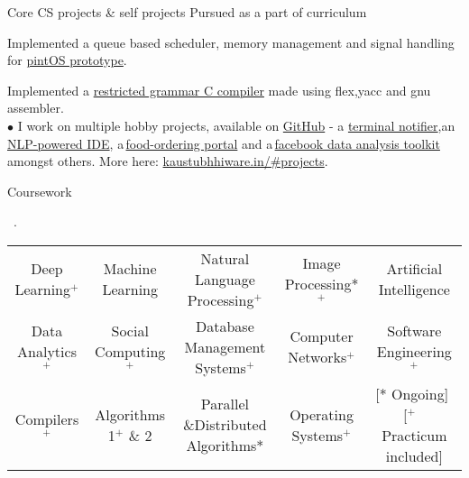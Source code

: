 \documentclass[11pt, a4paper]{resume}
\newcommand{\important}[1]{
  \textcolor{mypurple}{#1}
}
\newcommand{\fillit}[1]{
  \leavevmode\xleaders\hbox{#1}\hfill\kern0pt
}
\newcommand{\sectionSubtitleX}[1]{
  \begin{large}
    \important{#1}
    \end{large}
    \fillit{\important{.}}
}
\begin{document}

\begin{rSubsection}{Core CS projects \& self projects}{\hspace*{\fill} Pursued as a part of curriculum}{}{}
\item Implemented a queue based scheduler, memory management and signal handling for \href{https://github.com/kaustubhhiware/OSLab}{pintOS prototype}.
\item Implemented a \href{https://github.com/kaustubhhiware/cOMPILER}{restricted grammar C compiler} made using flex,yacc and gnu assembler.\\
$\bullet$ I work on multiple hobby projects, available on \href{https://github.com/kaustubhhiware}{GitHub} - a \href{https://github.com/kaustubhhiware/ NotiFyre}{terminal notifier},an\,\href{https://github.com/kaustubhhiware/c0derunR}{ NLP-powered IDE}, a\,\href{https://github.com/kaustubhhiware/Foodspark}{food-ordering portal} and a\,\href{https://github.com/kaustubhhiware/facebook-archive}{facebook data analysis toolkit} amongst others. More here: \href{https://kaustubhhiware.in/#projects}{kaustubhhiware.in/\#projects}.
\end{rSubsection}

\sectionSubtitleX{Coursework} 
\begin{tabular}{>{\footnotesize}c>{\footnotesize}c>{\footnotesize}c>{\footnotesize}c>{\footnotesize}c}
Deep Learning$^+$ & Machine Learning & Natural Language Processing$^+$ & Image Processing*$^+$ & Artificial Intelligence \\
Data Analytics$^+$ & Social Computing$^+$ & Database Management Systems$^+$ & Computer Networks$^+$ & Software Engineering$^+$ \\
Compilers$^+$ & Algorithms 1$^+$ \& 2 & Parallel \&Distributed Algorithms* & Operating Systems$^+$ & {\scriptsize [* Ongoing]\,\,[$^+$ \,\,Practicum included]} \\
\end{tabular}\\
\end{document}
